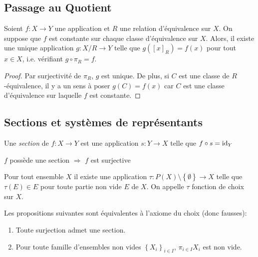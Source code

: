 \documentclass{cours}
\begin{document}
\subsection{Passage au Quotient}
\begin{theorem}\label{proprietequotient}
    Soient $f : X \rightarrow Y$ une application et $R$ une relation d'équivalence sur $X$. On suppose que $f$ est constante sur chaque classe d'équivalence sur $X$. Alors, il existe une unique application $g : X/R \rightarrow Y$ telle que $g\left(\left[x\right]_{R}\right) = f(x)$ pour tout $x \in X$, i.e. vérifiant $g \circ \pi_{R} = f$.
\end{theorem}
\begin{proof}
    Par surjectivité de $\pi_{R}$, $g$ est unique. De plus, si $C$ est une classe de $R$-équivalence, il y a un sens à poser $g(C) = f(x)$ car $C$ est une classe d'équivalence sur laquelle $f$ est constante.
\end{proof}

\subsection{Sections et systèmes de représentants}
\begin{definition}
    Une \emph{section} de $f : X \rightarrow Y$ est une application $s : Y \rightarrow X$ telle que $f \circ s = \textmd{id}_{Y}$
\end{definition}
\begin{proposition}
    $f$ possède une section $\Rightarrow$ $f$ est surjective
\end{proposition}

\begin{definition}\label{AC}
    Pour tout ensemble $X$ il existe une application $\tau : P(X) \setminus \left\{\emptyset\right\} \rightarrow X$ telle que $\tau(E) \in E$ pour toute partie non vide $E$ de $X$. On appelle $\tau$ fonction de choix sur $X$.
\end{definition}

\begin{proposition}
    Les propositions suivantes sont équivalentes à l'axiome du choix (donc fausses):
    \begin{enumerate}
        \item Toute surjection admet une section.
        \item Pour toute famille d'ensembles non vides $\left\{X_{i}\right\}_{i\in I}$, $\pi_{i\in I}X_{i}$ est non vide.
    \end{enumerate}
\end{proposition}
\end{document}
